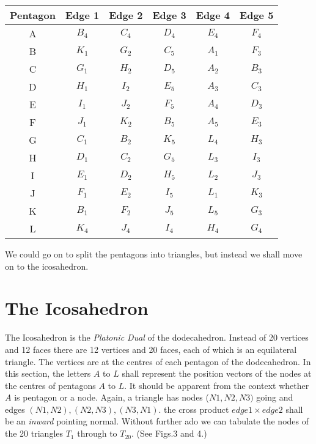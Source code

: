 \documentclass[12pt]{article}
\begin{document}
\begin{center}
\begin{tabular}{| c | c | c | c | c | c |}
\hline
Pentagon &  Edge 1 & Edge 2 & Edge 3 &  Edge 4 & Edge 5 \\
\hline
A  & $B_{4}$ & $C_{4}$ & $D_{4}$ & $E_{4}$ & $F_{4}$ \\
B  & $K_{1}$ & $G_{2}$ & $C_{5}$ & $A_{1}$ & $F_{3}$ \\
C  & $G_{1}$ & $H_{2}$ & $D_{5}$ & $A_{2}$ & $B_{3}$ \\
D  & $H_{1}$ & $I_{2}$ & $E_{5}$ & $A_{3}$ & $C_{3}$ \\
E  & $I_{1}$ & $J_{2}$ & $F_{5}$ & $A_{4}$ & $D_{3}$ \\
F  & $J_{1}$ & $K_{2}$ & $B_{5}$ & $A_{5}$ & $E_{3}$ \\
G  & $C_{1}$ & $B_{2}$ & $K_{5}$ & $L_{4}$ & $H_{3}$ \\
H  & $D_{1}$ & $C_{2}$ & $G_{5}$ & $L_{3}$ & $I_{3}$ \\
I  & $E_{1}$ & $D_{2}$ & $H_{5}$ & $L_{2}$ & $J_{3}$ \\
J  & $F_{1}$ & $E_{2}$ & $I_{5}$ & $L_{1}$ & $K_{3}$ \\
K  & $B_{1}$ & $F_{2}$ & $J_{5}$ & $L_{5}$ & $G_{3}$ \\
L  & $K_{4}$ & $J_{4}$ & $I_{4}$ & $H_{4}$ & $G_{4}$ \\
\hline
\end{tabular}
\end{center}

We could go on to split the pentagons into triangles, but instead we shall move on to
the icosahedron.

\section{The Icosahedron}

The Icosahedron is the {\it Platonic Dual} of the dodecahedron. Instead of 20
vertices and 12 faces there are 12 vertices and 20 faces, each of which is an
equilateral triangle. The vertices are at the centres of each pentagon of the
 dodecahedron. In this section, the letters $A$ to $L$ shall represent the position
vectors of the nodes at the centres of pentagons $A$ to $L$. It should be apparent from
the context whether $A$ is pentagon or a node. Again, a triangle has nodes
($N1, N2, N3)$ going  and edges $ (N1,N2), (N2,N3), (N3,N1)$. the cross product
 $edge 1 \times edge 2$ shall be an {\it inward} pointing normal. Without further ado
we can tabulate the nodes of the 20 triangles $T_1$ through to $T_20$. (See Figs.3 and 4.)
\end{document}
